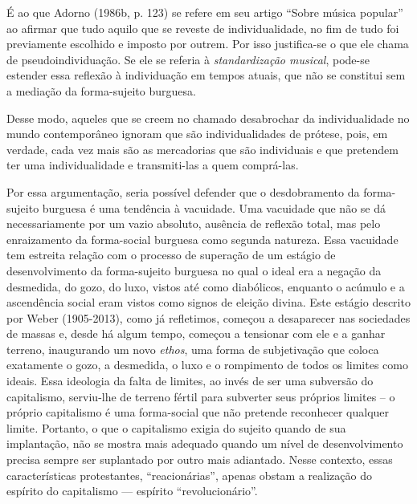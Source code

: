 É ao que Adorno (1986b, p. 123) se refere em seu artigo ``Sobre música
popular'' ao afirmar que tudo aquilo que se reveste de individualidade,
no fim de tudo foi previamente escolhido e imposto por outrem. Por isso
justifica-se o que ele chama de pseudoindividuação. Se ele se referia à
\emph{standardização musical}, pode-se estender essa reflexão à
individuação em tempos atuais, que não se constitui sem a mediação da
forma-sujeito burguesa.

Desse modo, aqueles que se creem no chamado desabrochar da
individualidade no mundo contemporâneo ignoram que são individualidades
de prótese, pois, em verdade, cada vez mais são as mercadorias que são
individuais e que pretendem ter uma individualidade e transmiti-las a
quem comprá-las.

Por essa argumentação, seria possível defender que o desdobramento da
forma-sujeito burguesa é uma tendência à vacuidade. Uma vacuidade que
não se dá necessariamente por um vazio absoluto, ausência de reflexão
total, mas pelo enraizamento da forma-social burguesa como segunda
natureza. Essa vacuidade tem estreita relação com o processo de
superação de um estágio de desenvolvimento da forma-sujeito burguesa no
qual o ideal era a negação da desmedida, do gozo, do luxo, vistos até
como diabólicos, enquanto o acúmulo e a ascendência social eram vistos
como signos de eleição divina. Este estágio descrito por Weber
(1905-2013), como já refletimos, começou a desaparecer nas sociedades de
massas e, desde há algum tempo, começou a tensionar com ele e a ganhar
terreno, inaugurando um novo \emph{ethos}, uma forma de subjetivação que
coloca exatamente o gozo, a desmedida, o luxo e o rompimento de todos os
limites como ideais. Essa ideologia da falta de limites, ao invés de ser
uma subversão do capitalismo, serviu-lhe de terreno fértil para
subverter seus próprios limites -- o próprio capitalismo é uma
forma-social que não pretende reconhecer qualquer limite\emph{.}
Portanto, o que o capitalismo exigia do sujeito quando de sua
implantação, não se mostra mais adequado quando um nível de
desenvolvimento precisa sempre ser suplantado por outro mais adiantado.
Nesse contexto, essas características protestantes, ``reacionárias'',
apenas obstam a realização do espírito do capitalismo --- espírito
``revolucionário''.

